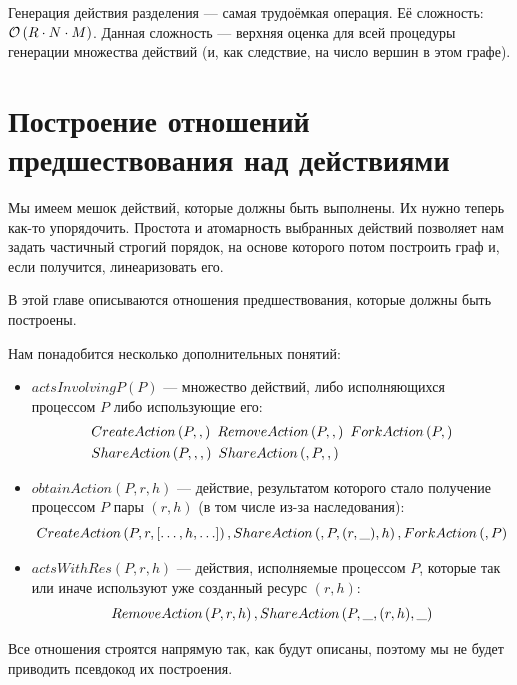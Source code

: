 Генерация действия разделения --- самая трудоёмкая операция. Её сложность: $\mathcal{O}\left(R \cdot N \cdot M\right)$. Данная сложность --- верхняя оценка для всей процедуры генерации множества действий (и, как следствие, на число вершин в этом графе).

\section{Построение отношений предшествования над действиями}
\label{chap2:sec:preced}

Мы имеем мешок действий, которые должны быть выполнены. Их нужно теперь как-то упорядочить. Простота и атомарность выбранных действий позволяет нам задать частичный строгий порядок, на основе которого потом построить граф и, если получится, линеаризовать его.

В этой главе описываются отношения предшествования, которые должны быть построены.

Нам понадобится несколько дополнительных понятий:

\begin{itemize}
	\item $actsInvolvingP(P)$ --- множество действий, либо исполняющихся процессом $P$ либо использующие его:
\begin{align*}
	&CreateAction\left( P, ,  \right)\ RemoveAction\left( P, ,  \right)\ ForkAction\left( P,  \right) \\
	&ShareAction\left( P, , ,  \right)\ ShareAction\left( , P, ,  \right)
\end{align*}

	\item $obtainAction(P, r, h)$ --- действие, результатом которого стало получение процессом $P$ пары $(r, h)$ (в том числе из-за наследования):
	\begin{equation*}
		CreateAction\left( P, r, [\ldots, h, \ldots] \right), ShareAction\left( , P, (r, \_), h \right), ForkAction\left( , P \right)
	\end{equation*}

	\item $actsWithRes(P, r, h)$ --- действия, исполняемые процессом $P$, которые так или иначе используют уже созданный ресурс $(r, h)$:
	\begin{equation*}
		RemoveAction\left( P, r, h \right), ShareAction\left( P, \_, (r, h), \_ \right)
	\end{equation*}
\end{itemize}

Все отношения строятся напрямую так, как будут описаны, поэтому мы не будет приводить псевдокод их построения.

